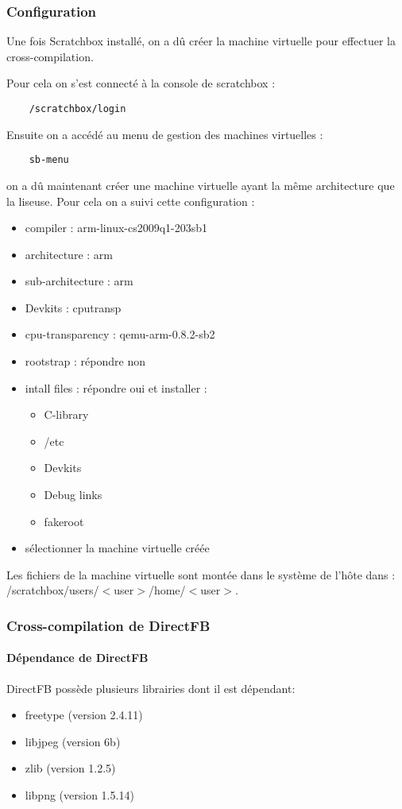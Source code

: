 \subsubsection{Configuration}

Une fois Scratchbox installé, on a dû créer la machine virtuelle pour effectuer la cross-compilation.

Pour cela on s'est connecté à la console de scratchbox : 
\begin{lstlisting}
	/scratchbox/login
\end{lstlisting}
Ensuite on a accédé au menu de gestion des machines virtuelles : 
\begin{lstlisting}
	sb-menu
\end{lstlisting}
on a dû maintenant créer une machine virtuelle ayant la même architecture que la liseuse. 
Pour cela on a suivi cette configuration : 
\begin{itemize}
\renewcommand{\labelitemi}{$\bullet$}
	\item compiler : arm-linux-cs2009q1-203sb1
	\item architecture : arm
	\item sub-architecture : arm
	\item Devkits : cputransp
	\item cpu-transparency :  qemu-arm-0.8.2-sb2
	\item rootstrap : répondre non
	\item intall files : répondre oui et installer :
		\begin{itemize}
			\item C-library
			\item /etc
			\item Devkits 
			\item Debug links
			\item fakeroot
		\end{itemize}
	\item sélectionner la machine virtuelle créée
\end{itemize}

Les fichiers de la machine virtuelle sont montée dans le système de l’hôte dans : 
/scratchbox/users/$<$user$>$/home/$<$user$>$.

\subsubsection{Cross-compilation de DirectFB}

\paragraph{Dépendance de DirectFB}
DirectFB possède plusieurs librairies dont il est dépendant: 
	\begin{itemize}
		\item freetype (version 2.4.11)
		\item libjpeg (version 6b)
		\item zlib (version 1.2.5)
		\item libpng (version 1.5.14)
	\end{itemize}

